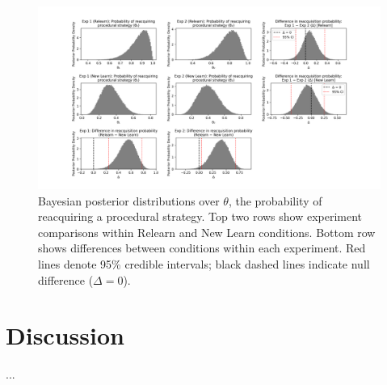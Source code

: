 \documentclass{article}
\begin{document}
\begin{figure}[H]
    \centering
    \includegraphics[width=\textwidth]{../figures/bayesian_comparison.png}
    \caption{
        Bayesian posterior distributions over $\theta$, the
        probability of reacquiring a procedural strategy.
        Top two rows show experiment comparisons within
        Relearn and New Learn conditions. Bottom row shows
        differences between conditions within each
        experiment. Red lines denote 95\% credible
        intervals; black dashed lines indicate null
        difference ($\Delta = 0$).
}
\label{fig_dbm_stats}
\end{figure}

\section{Discussion}
...
\end{document}
